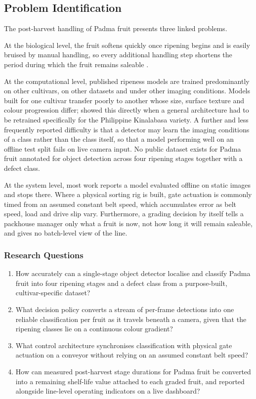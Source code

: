 \subsection{Problem Identification}
\label{sec:problem}

The post-harvest handling of Padma fruit presents three linked problems.

At the biological level, the fruit softens quickly once ripening begins and is easily bruised by manual handling, so every additional handling step shortens the period during which the fruit remains saleable \citep{abekoon2024}.

At the computational level, published ripeness models are trained predominantly on other cultivars, on other datasets and under other imaging conditions. Models built for one cultivar transfer poorly to another whose size, surface texture and colour progression differ; \citet{nalupano2024} showed this directly when a general architecture had to be retrained specifically for the Philippine Kinalabasa variety. A further and less frequently reported difficulty is that a detector may learn the imaging conditions of a class rather than the class itself, so that a model performing well on an offline test split fails on live camera input. No public dataset exists for Padma fruit annotated for object detection across four ripening stages together with a defect class.

At the system level, most work reports a model evaluated offline on static images and stops there. Where a physical sorting rig is built, gate actuation is commonly timed from an assumed constant belt speed, which accumulates error as belt speed, load and drive slip vary. Furthermore, a grading decision by itself tells a packhouse manager only what a fruit is now, not how long it will remain saleable, and gives no batch-level view of the line.

\subsubsection{Research Questions}
\label{sec:questions}

\begin{enumerate}
    \item How accurately can a single-stage object detector localise and classify Padma fruit into four ripening stages and a defect class from a purpose-built, cultivar-specific dataset?
    \item What decision policy converts a stream of per-frame detections into one reliable classification per fruit as it travels beneath a camera, given that the ripening classes lie on a continuous colour gradient?
    \item What control architecture synchronises classification with physical gate actuation on a conveyor without relying on an assumed constant belt speed?
    \item How can measured post-harvest stage durations for Padma fruit be converted into a remaining shelf-life value attached to each graded fruit, and reported alongside line-level operating indicators on a live dashboard?
\end{enumerate}

